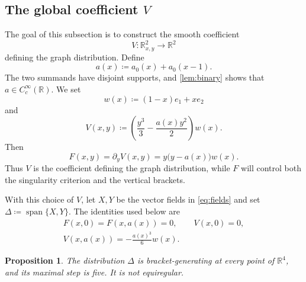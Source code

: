 \documentclass[11pt]{amsart}
\newtheorem{proposition}[theorem]{Proposition}
\numberwithin{equation}{section}
\theoremstyle{remark}
\newcommand{\R}{\mathbb R}
\newcommand{\Span}{\operatorname{span}}
\begin{document}
\subsection{The global coefficient \texorpdfstring{$V$}{V}}

The goal of this subsection is to construct the smooth coefficient
\begin{equation}
 V:\R^2_{x,y}\longrightarrow\R^2
\end{equation}
defining the graph distribution.  Define
\begin{equation}
 a(x)\coloneq a_0(x)+a_0(x-1).
\end{equation}
The two summands have disjoint supports, and \cref{lem:binary} shows
that $a\in C_c^\infty(\R)$.  We set
\begin{equation}\label{eq:w}
 w(x)\coloneq(1-x)e_1+xe_2
\end{equation}
and
\begin{equation}
 V(x,y)\coloneq
 \left(\frac{y^3}{3}-\frac{a(x)y^2}{2}\right)w(x).
\end{equation}
Then
\begin{equation}\label{eq:F-global}
 F(x,y)=\partial_yV(x,y)
 =y\bigl(y-a(x)\bigr)w(x).
\end{equation}
Thus $V$ is the coefficient defining the graph distribution, while $F$
will control both the singularity criterion and the vertical brackets.

With this choice of $V$, let $X,Y$ be the vector fields in
\eqref{eq:fields} and set $\Delta\coloneq\Span\{X,Y\}$.  The identities
used below are
\begin{equation}\label{eq:root-identities}
 \begin{gathered}
  F(x,0)=F(x,a(x))=0,
  \qquad
  V(x,0)=0,\\
  V(x,a(x))=-\frac{a(x)^3}{6}w(x).
 \end{gathered}
\end{equation}

\begin{proposition}\label{prop:bracket-generating}
The distribution $\Delta$ is bracket-generating at every point of
$\R^4$, and its maximal step is five.  It is not equiregular.
\end{proposition}
\end{document}
